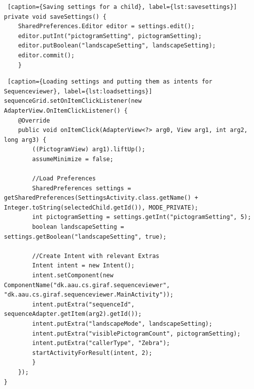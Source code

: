 \begin{lstlisting} [caption={Saving settings for a child}, label={lst:savesettings}]
private void saveSettings() {
    SharedPreferences.Editor editor = settings.edit();
    editor.putInt("pictogramSetting", pictogramSetting);
    editor.putBoolean("landscapeSetting", landscapeSetting);
    editor.commit();
    }
\end{lstlisting}

\begin{lstlisting} [caption={Loading settings and putting them as intents for Sequenceviewer}, label={lst:loadsettings}]
sequenceGrid.setOnItemClickListener(new AdapterView.OnItemClickListener() {
	@Override
	public void onItemClick(AdapterView<?> arg0, View arg1, int arg2, long arg3) {
		((PictogramView) arg1).liftUp();
		assumeMinimize = false;
		
		//Load Preferences
		SharedPreferences settings = getSharedPreferences(SettingsActivity.class.getName() + Integer.toString(selectedChild.getId()), MODE_PRIVATE);
		int pictogramSetting = settings.getInt("pictogramSetting", 5);
		boolean landscapeSetting = settings.getBoolean("landscapeSetting", true);

		//Create Intent with relevant Extras
		Intent intent = new Intent();
		intent.setComponent(new ComponentName("dk.aau.cs.giraf.sequenceviewer", "dk.aau.cs.giraf.sequenceviewer.MainActivity"));
		intent.putExtra("sequenceId", sequenceAdapter.getItem(arg2).getId());
		intent.putExtra("landscapeMode", landscapeSetting);
		intent.putExtra("visiblePictogramCount", pictogramSetting);
		intent.putExtra("callerType", "Zebra");
		startActivityForResult(intent, 2);
		}
	});
}
\end{lstlisting}